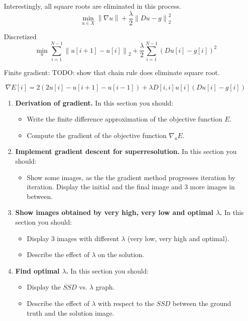 \documentclass{paper}
\newcommand{\norm}[1]{\left\lVert#1\right\rVert}
\begin{document}
Interestingly, all square roots are eliminated in this process.
\begin{equation}
\min_{u \in X} \norm{\nabla u} + \frac{\lambda}{2} \norm{Du - g}^2_2
\end{equation}

Discretized 
\begin{equation}
\min_{u} \sum_{i=1}^{N-1} \norm{u[i+1] - u[i]}_2 + 
\frac{\lambda}{2} \sum_{i=1}^{N-1} (Du[i] - g[i])^2
\end{equation}

Finite gradient:
TODO: show that chain rule does eliminate square root.

\begin{equation}
\nabla E[i] = 2 (2u[i] - u[i + 1] - u[i - 1]) + \lambda D[i,i] u[i] (Du[i] - g[i])
\end{equation}
\begin{enumerate}
\item \textbf{Derivation of gradient.} In this section you should:

\begin{itemize}
\item Write the finite difference approximation of the objective function $E$.
\item Compute the gradient of the objective function $\nabla_uE$.  
\end{itemize}


\item \textbf{Implement gradient descent for superresolution.} In this section you should:

\begin{itemize}
\item Show some images, as the the gradient method progresses iteration by iteration. Display the initial and the final image and 3 more images in between.
\end{itemize}

\item \textbf{Show images obtained by very high, very low and optimal $\lambda$.} In this section you should:

\begin{itemize}
\item Display 3 images with different $\lambda$ (very low, very high and optimal).
\item Describe the effect of $\lambda$ on the solution.
\end{itemize}

\item \textbf{ Find optimal $\lambda$.} In this section you should:

\begin{itemize}
\item Display the $SSD$ vs. $\lambda$ graph.
\item Describe the effect of $\lambda$ with respect to the $SSD$ between the ground truth and the solution image.
\end{itemize}


\end{enumerate}


 
\end{document}
